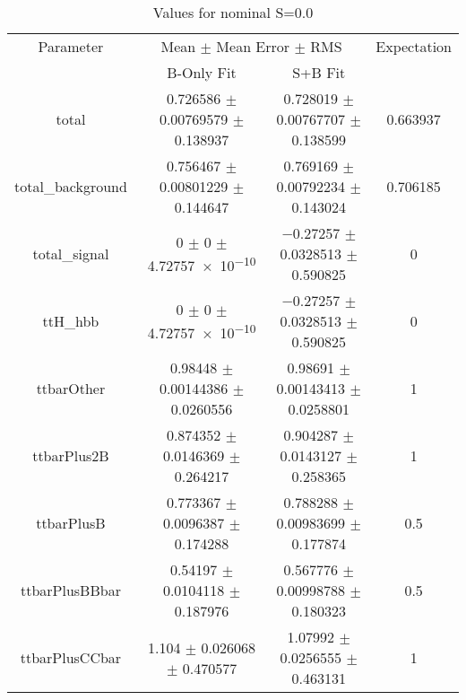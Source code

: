\begin{table}
\centering
\caption{Values for nominal S=0.0}
\begin{tabular}{cccc}
\toprule
Parameter & \multicolumn{2}{c}{Mean $\pm$ Mean Error $\pm$ RMS} & Expectation\\
 & B-Only Fit & S+B Fit & \\
\midrule
total & \num{0.726586} $\pm$ \num{0.00769579} $\pm$ \num{0.138937} & \num{0.728019} $\pm$ \num{0.00767707} $\pm$ \num{0.138599} & \num{0.663937}\\
total\_background & \num{0.756467} $\pm$ \num{0.00801229} $\pm$ \num{0.144647} & \num{0.769169} $\pm$ \num{0.00792234} $\pm$ \num{0.143024} & \num{0.706185}\\
total\_signal & \num{0} $\pm$ \num{0} $\pm$ \num{4.72757e-10} & \num{-0.27257} $\pm$ \num{0.0328513} $\pm$ \num{0.590825} & \num{0}\\
ttH\_hbb & \num{0} $\pm$ \num{0} $\pm$ \num{4.72757e-10} & \num{-0.27257} $\pm$ \num{0.0328513} $\pm$ \num{0.590825} & \num{0}\\
ttbarOther & \num{0.98448} $\pm$ \num{0.00144386} $\pm$ \num{0.0260556} & \num{0.98691} $\pm$ \num{0.00143413} $\pm$ \num{0.0258801} & \num{1}\\
ttbarPlus2B & \num{0.874352} $\pm$ \num{0.0146369} $\pm$ \num{0.264217} & \num{0.904287} $\pm$ \num{0.0143127} $\pm$ \num{0.258365} & \num{1}\\
ttbarPlusB & \num{0.773367} $\pm$ \num{0.0096387} $\pm$ \num{0.174288} & \num{0.788288} $\pm$ \num{0.00983699} $\pm$ \num{0.177874} & \num{0.5}\\
ttbarPlusBBbar & \num{0.54197} $\pm$ \num{0.0104118} $\pm$ \num{0.187976} & \num{0.567776} $\pm$ \num{0.00998788} $\pm$ \num{0.180323} & \num{0.5}\\
ttbarPlusCCbar & \num{1.104} $\pm$ \num{0.026068} $\pm$ \num{0.470577} & \num{1.07992} $\pm$ \num{0.0256555} $\pm$ \num{0.463131} & \num{1}\\
\bottomrule
\end{tabular}
\end{table}